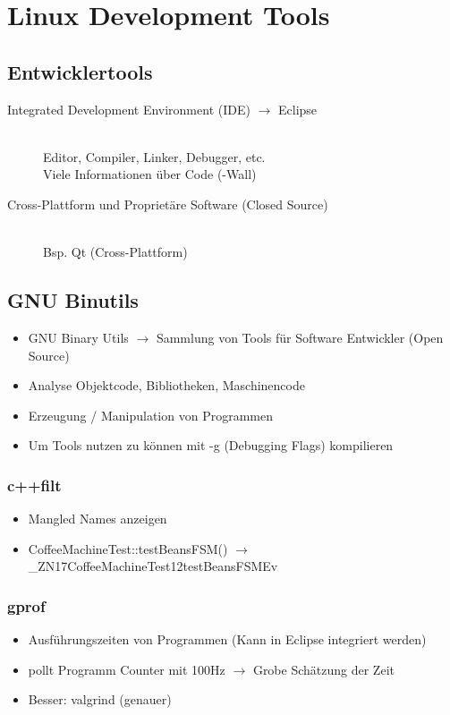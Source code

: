 \section{Linux Development Tools}
\subsection{Entwicklertools}
\begin{description}
    \item [Integrated Development Environment (IDE) $\rightarrow$ Eclipse] \hfill \\
    Editor, Compiler, Linker, Debugger, etc. \\
    Viele Informationen über Code (-Wall)
    \item [Cross-Plattform und Proprietäre Software (Closed Source)] \hfill \\
    Bsp. Qt (Cross-Plattform)
\end{description}

\subsection{GNU Binutils}
\begin{itemize}
    \item GNU Binary Utils $\rightarrow$ Sammlung von Tools für Software Entwickler (Open Source)
    \item Analyse Objektcode, Bibliotheken, Maschinencode
    \item Erzeugung / Manipulation von Programmen
    \item Um Tools nutzen zu können mit -g (Debugging Flags) kompilieren
\end{itemize}

\subsubsection{c++filt}
\begin{itemize}
    \item Mangled Names anzeigen
    \item CoffeeMachineTest::testBeansFSM() $\rightarrow$ \_ZN17CoffeeMachineTest12testBeansFSMEv
\end{itemize}

\subsubsection{gprof}
\begin{itemize}
    \item Ausführungszeiten von Programmen (Kann in Eclipse integriert werden)
    \item pollt Programm Counter mit 100Hz $\rightarrow$ Grobe Schätzung der Zeit
    \item Besser: valgrind (genauer)
\end{itemize}

